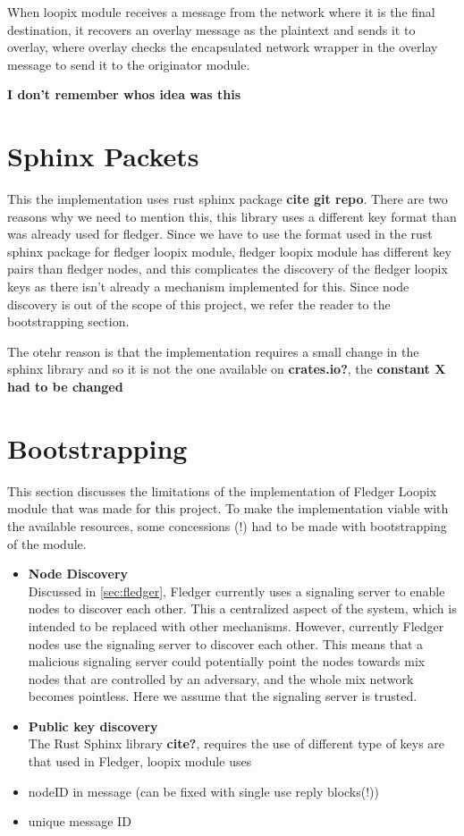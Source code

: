 \documentclass[a4paper,11pt,oneside]{report}
\begin{document}
When loopix module receives a message from the network where it is the final destination, it recovers an overlay message as the plaintext and sends it to overlay, where overlay checks the encapsulated network wrapper in the overlay message to send it to the originator module.

\textbf{I don't remember whos idea was this}

\section{Sphinx Packets}

This the implementation uses rust sphinx package \textbf{cite git repo}. There are two reasons why we need to mention this, this library uses a different key format than was already used for fledger. Since we have to use the format used in the rust sphinx package for fledger loopix module, fledger loopix module has different key pairs than fledger nodes, and this complicates the discovery of the fledger loopix keys as there isn't already a mechanism implemented for this. Since node discovery is out of the scope of this project, we refer the reader to the bootstrapping section.

The otehr reason is that the implementation requires a small change in the sphinx library and so it is not the one available on \textbf{crates.io?}, the \textbf{constant X had to be changed}

\section{Bootstrapping}
\label{sec:design_bootstrapping}

This section discusses the limitations of the implementation of Fledger Loopix module that was made for this project. To make the implementation viable with the available resources, some concessions (!) had to be made with bootstrapping of the module.

\begin{itemize}
    \item \textbf{Node Discovery}\\
    Discussed in \autoref{sec:fledger}, Fledger currently uses a signaling server to enable nodes to discover each other. This a centralized aspect of the system, which is intended to be replaced with other mechanisms. However, currently Fledger nodes use the signaling server to discover each other. This means that a malicious signaling server could potentially point the nodes towards mix nodes that are controlled by an adversary, and the whole mix network becomes pointless. Here we assume that the signaling server is trusted.
    \item \textbf{Public key discovery}\\
    The Rust Sphinx library \textbf{cite?}, requires the use of different type of keys are that used in Fledger, loopix module uses  
    \item nodeID in message (can be fixed with single use reply blocks(!))
    \item unique message ID
\end{itemize}
\end{document}
